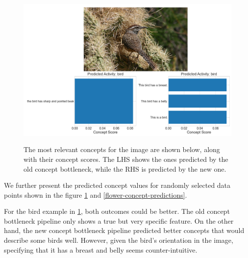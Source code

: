 \begin{figure}[h]
\caption{The most relevant concepts for the image are shown below, along with their concept scores. The LHS shows the ones predicted by the old concept bottleneck, while the RHS is predicted by the new one.}
\centering
\includegraphics[width=\textwidth]{concept-bottleneck-pipeline/birds_predictions.png}
\label{bird-concept-predictions}
\end{figure}

We further present the predicted concept values for randomly selected data points shown in the figure \ref{bird-concept-predictions} and \ref{flower-concept-predictions}.

For the bird example in \ref{bird-concept-predictions}, both outcomes could be better.
The old concept bottleneck pipeline only shows a true but very specific feature.
On the other hand, the new concept bottleneck pipeline predicted better concepts that would describe some birds well.
However, given the bird's orientation in the image, specifying that it has a breast and belly seems counter-intuitive.

